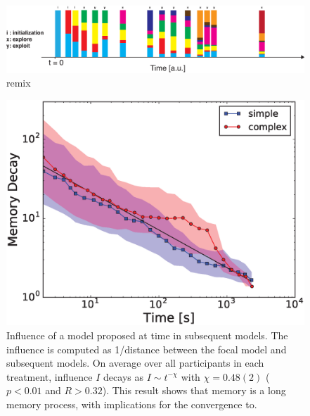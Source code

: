 \begin{figure}[h!]
\begin{center}
\includegraphics[width=16cm]{figures/schematic_remix.eps}
\caption{remix}
\label{fig:schematic_remix}
\end{center}
\end{figure}


\begin{figure}[h!]
\begin{center}
\includegraphics[width=13cm]{figures/MemoryDecay.eps}
\caption{Influence of a model proposed at time in subsequent models. The influence is computed as 1/distance between the focal model and subsequent models. On average over all participants in each treatment, influence $I$ decays as $I \sim t^{-\chi}$ with $\chi = 0.48(2)$ ($p < 0.01$ and $R > 0.32$). This result shows that memory is a long memory process, with implications for the convergence to.}
\label{fig:memory}
\end{center}
\end{figure}




